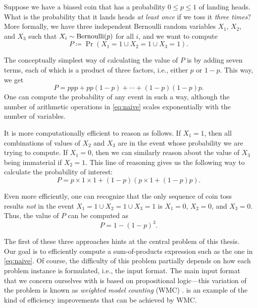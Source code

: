 \begin{example}\label{example:veryfirst}
  Suppose we have a biased coin that has a probability $0 \le p \le 1$ of
  landing heads. What is the probability that it lands heads \emph{at least
    once} if we toss it \emph{three times}? More formally, we have three
  independent Bernoulli random variables $X_1$, $X_2$, and $X_3$ such that
  $X_i \sim \operatorname{Bernoulli}(p)$ for all $i$, and we want to compute
  \[
    P \coloneqq \Pr(X_1 = 1 \cup X_2 = 1 \cup X_3 = 1).
  \]

  The conceptually simplest way of calculating the value of $P$ is by adding
  seven terms, each of which is a product of three factors, i.e., either $p$ or
  $1-p$. This way, we get
  \begin{equation} \label{eq:naive}
    P = ppp + pp(1-p) + \cdots + (1-p)(1-p)p.
  \end{equation}
  One can compute the probability of any event in such a way, although the
  number of arithmetic operations in \cref{eq:naive} scales exponentially with
  the number of variables.

  It is more computationally efficient to reason as follows. If $X_1 = 1$, then
  all combinations of values of $X_2$ and $X_3$ are in the event whose
  probability we are trying to compute. If $X_1 = 0$, then we can similarly
  reason about the value of $X_3$ being immaterial if $X_2 = 1$. This line of
  reasoning gives us the following way to calculate the probability of interest:
  \begin{equation} \label{eq:wmcexample}
    P = p \times 1 \times 1 + (1-p)(p \times 1 + (1-p)p).
  \end{equation}

  Even more efficiently, one can recognize that the only sequence of coin toss
  results \emph{not} in the event $X_1 = 1 \cup X_2 = 1 \cup X_3 = 1$ is
  $X_1 = 0$, $X_2 = 0$, and $X_3 = 0$. Thus, the value of $P$ can be computed as
  \begin{equation} \label{eq:wfomcexample}
    P = 1 - {(1-p)}^3.
  \end{equation}
\end{example}

The first of these three approaches hints at the central problem of this thesis.
Our goal is to efficiently compute a sum-of-products expression such as the one
in \cref{eq:naive}. Of course, the difficulty of this problem partially depends
on how each problem instance is formulated, i.e., the input format. The main
input format that we concern ourselves with is based on propositional
logic---this variation of the problem is known as \emph{weighted model counting}
(WMC) \citep{DBLP:journals/ai/ChaviraD08}.  is an example of
the kind of efficiency improvements that can be achieved by WMC\@.

